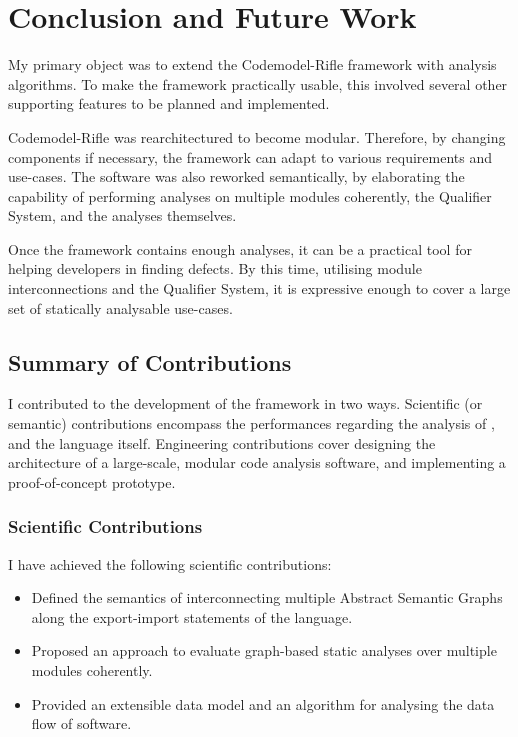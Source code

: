 \chapter{Conclusion and Future Work}
\label{chapter:conclusion}

My primary object was to extend the Codemodel-Rifle framework with analysis algorithms. To make the framework practically usable, this involved several other supporting features to be planned and implemented.

Codemodel-Rifle was rearchitectured to become modular. Therefore, by changing components if necessary, the framework can adapt to various requirements and use-cases. The software was also reworked semantically, by elaborating the capability of performing analyses on multiple modules coherently, the Qualifier System, and the analyses themselves.

Once the framework contains enough analyses, it can be a practical tool for helping developers in finding defects. By this time, utilising module interconnections and the Qualifier System, it is expressive enough to cover a large set of statically analysable use-cases.


\section{Summary of Contributions}

I contributed to the development of the framework in two ways. Scientific (or semantic) contributions encompass the performances regarding the analysis of \es, and the language itself. Engineering contributions cover designing the architecture of a large-scale, modular code analysis software, and implementing a proof-of-concept prototype.


\subsection{Scientific Contributions}

I have achieved the following scientific contributions:

\begin{itemize}
\item Defined the semantics of interconnecting multiple Abstract Semantic Graphs along the export-import statements of the \es language.
\item Proposed an approach to evaluate graph-based static analyses over multiple \es modules coherently.
\item Provided an extensible data model and an algorithm for analysing the data flow of \es software.
\end{itemize}


